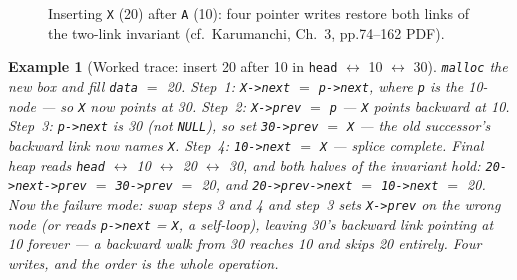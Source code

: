 \documentclass[11pt]{article}
\newtheorem{example}{Example}[section]
\begin{document}
\begin{figure}[h]
  \centering
  \caption{Inserting \texttt{X} (20) after \texttt{A} (10): four pointer writes restore both links of the two-link invariant (cf.\ Karumanchi, Ch.~3, pp.74--162 PDF).}
  \label{fig:dll-insert}
\end{figure}

\begin{example}[Worked trace: insert 20 after 10 in \texttt{head} $\leftrightarrow$ 10 $\leftrightarrow$ 30]
\texttt{malloc} the new box and fill \texttt{data} $=$ 20. Step~1: \texttt{X->next} $=$ \texttt{p->next}, where \texttt{p} is the 10-node --- so \texttt{X} now points at 30. Step~2: \texttt{X->prev} $=$ \texttt{p} --- \texttt{X} points backward at 10. Step~3: \texttt{p->next} is 30 (not \texttt{NULL}), so set \texttt{30->prev} $=$ \texttt{X} --- the old successor's backward link now names \texttt{X}. Step~4: \texttt{10->next} $=$ \texttt{X} --- splice complete. Final heap reads \texttt{head} $\leftrightarrow$ 10 $\leftrightarrow$ 20 $\leftrightarrow$ 30, and both halves of the invariant hold: \texttt{20->next->prev} $=$ \texttt{30->prev} $=$ 20, and \texttt{20->prev->next} $=$ \texttt{10->next} $=$ 20. Now the failure mode: swap steps 3 and 4 and step~3 sets \texttt{X->prev} on the wrong node (or reads \texttt{p->next} = \texttt{X}, a self-loop), leaving 30's backward link pointing at 10 forever --- a backward walk from 30 reaches 10 and skips 20 entirely. Four writes, and the order is the whole operation.
\end{example}
\end{document}
